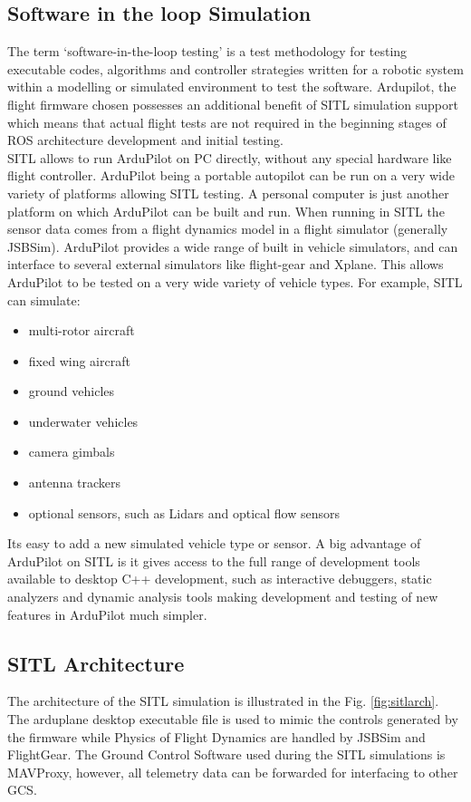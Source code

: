 \begin{spacing}{2}
\section{Software in the loop Simulation}
The term ‘software-in-the-loop testing’ is  a test methodology for testing executable codes, algorithms and controller strategies written for a robotic system within a modelling or simulated environment to test the software. Ardupilot, the flight firmware chosen possesses an additional benefit of SITL simulation support which means that actual flight tests are not required in the beginning stages of ROS architecture development and initial testing.\\ SITL allows to run ArduPilot on PC directly, without any special hardware like flight controller. ArduPilot being a portable autopilot can be run on a very wide variety of platforms allowing SITL testing. A personal computer is just another platform on which ArduPilot can be built and run. When running in SITL the sensor data comes from a flight dynamics model in a flight simulator (generally JSBSim). ArduPilot provides a wide range of built in vehicle simulators, and can interface to several external simulators like flight-gear and Xplane. This allows ArduPilot to be tested on a very wide variety of vehicle types. For example, SITL can simulate:
\begin{itemize}
    \item multi-rotor aircraft
    \item fixed wing aircraft
    \item ground vehicles
    \item underwater vehicles
    \item camera gimbals
    \item antenna trackers
    \item optional sensors, such as Lidars and optical flow sensors
\end{itemize}

\noindent Its easy to add a new simulated vehicle type or sensor.
A big advantage of ArduPilot on SITL is it gives access to the full range of
development tools available to desktop C++ development, such as interactive
debuggers, static analyzers and dynamic analysis tools making development and
testing of new features in ArduPilot much simpler.

\subsection{SITL Architecture}
The architecture of the SITL simulation is illustrated in the Fig. \ref{fig:sitlarch}. The
arduplane desktop executable file is used to mimic the controls generated by the
firmware while Physics of Flight Dynamics are handled by JSBSim and FlightGear.
The Ground Control Software used during the SITL simulations is MAVProxy,
however, all telemetry data can be forwarded for interfacing to other GCS.


\end{spacing}
